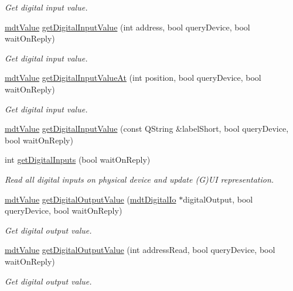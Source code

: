 \begin{DoxyCompactItemize}
\begin{DoxyCompactList}\small\item\em Get digital input value. \end{DoxyCompactList}\item 
\hyperlink{classmdt_value}{mdt\-Value} \hyperlink{classmdt_device_a9915b677a307ffeab98a413d61b0f2e7}{get\-Digital\-Input\-Value} (int address, bool query\-Device, bool wait\-On\-Reply)
\begin{DoxyCompactList}\small\item\em Get digital input value. \end{DoxyCompactList}\item 
\hyperlink{classmdt_value}{mdt\-Value} \hyperlink{classmdt_device_a8a17dbc767f75813241ce4a9709d0ac7}{get\-Digital\-Input\-Value\-At} (int position, bool query\-Device, bool wait\-On\-Reply)
\begin{DoxyCompactList}\small\item\em Get digital input value. \end{DoxyCompactList}\item 
\hyperlink{classmdt_value}{mdt\-Value} \hyperlink{classmdt_device_a295a2795695804cc291282d92a1c7641}{get\-Digital\-Input\-Value} (const Q\-String \&label\-Short, bool query\-Device, bool wait\-On\-Reply)
\item 
int \hyperlink{classmdt_device_a6e338b959c86591b6b3401f925c49050}{get\-Digital\-Inputs} (bool wait\-On\-Reply)
\begin{DoxyCompactList}\small\item\em Read all digital inputs on physical device and update (G)U\-I representation. \end{DoxyCompactList}\item 
\hyperlink{classmdt_value}{mdt\-Value} \hyperlink{classmdt_device_a978bde9f2b6177b6f3742163e7a712a9}{get\-Digital\-Output\-Value} (\hyperlink{classmdt_digital_io}{mdt\-Digital\-Io} $\ast$digital\-Output, bool query\-Device, bool wait\-On\-Reply)
\begin{DoxyCompactList}\small\item\em Get digital output value. \end{DoxyCompactList}\item 
\hyperlink{classmdt_value}{mdt\-Value} \hyperlink{classmdt_device_adf8160df55a9eb9ba6820e24bb7f1440}{get\-Digital\-Output\-Value} (int address\-Read, bool query\-Device, bool wait\-On\-Reply)
\begin{DoxyCompactList}\small\item\em Get digital output value. \end{DoxyCompactList}\item 

\end{DoxyCompactItemize}
